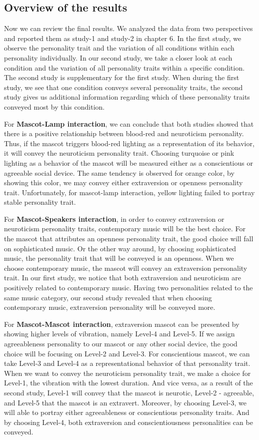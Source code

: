 \subsection{Overview of the results}
Now we can review the final results. We analyzed the data from two perspectives and reported them as study-1 and study-2 in chapter 6. In the first study, we observe the personality trait and the variation of all conditions within each personality individually. In our second study, we take a closer look at each condition and the variation of all personality traits within a specific condition. The second study is supplementary for the first study. When during the first study, we see that one condition conveys several personality traits, the second study gives us additional information regarding which of these personality traits conveyed most by this condition.
\par For \textbf{Mascot-Lamp interaction}, we can conclude that both studies showed that there is a positive relationship between blood-red and neuroticism personality. Thus, if the mascot triggers blood-red lighting as a representation of its behavior, it will convey the neuroticism personality trait. Choosing turquoise or pink lighting as a behavior of the mascot will be measured either as a conscientious or agreeable social device. The same tendency is observed for orange color, by showing this color, we may convey either extraversion or openness personality trait. Unfortunately, for mascot-lamp interaction, yellow lighting failed to portray stable personality trait. 
\par For \textbf{Mascot-Speakers interaction}, in order to convey extraversion or neuroticism personality traits, contemporary music will be the best choice. For the mascot that attributes an openness personality trait, the good choice will fall on sophisticated music. Or the other way around, by choosing sophisticated music, the personality trait that will be conveyed is an openness. When we choose contemporary music, the mascot will convey an extraversion personality trait. In our first study, we notice that both extraversion and neuroticism are positively related to contemporary music. Having two personalities related to the same music category, our second study revealed that when choosing contemporary music, extraversion personality will be conveyed more.
\par For \textbf{Mascot-Mascot interaction}, extraversion mascot can be presented by showing higher levels of vibration, namely Level-4 and Level-5. If we assign agreeableness personality to our mascot or any other social device, the good choice will be focusing on Level-2 and Level-3. For conscientious mascot, we can take Level-3 and Level-4 as a representational behavior of that personality trait. When we want to convey the neuroticism personality trait, we make a choice for Level-1, the vibration with the lowest duration. And vice versa, as a result of the second study, Level-1 will convey that the mascot is neurotic, Level-2 - agreeable, and Level-5 that the mascot is an extravert. Moreover, by choosing Level-3, we will able to portray either agreeableness or conscientious personality traits. And by choosing Level-4, both extraversion and conscientiousness personalities can be conveyed.
